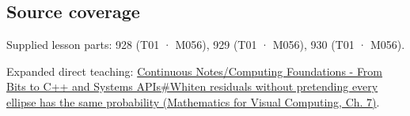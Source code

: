 \subsection{Source coverage}\label{appendix-12bbe185dbe5-source-coverage}

\hypertarget{appendix-12bbe185dbe5-source-coverage}{}

Supplied lesson parts: 928 (T01 · M056), 929 (T01 · M056), 930 (T01 · M056).

Expanded direct teaching: \href{../02-Mathematics-for-Visual-Computing/main.pdf\#nameddest=02-foundations-ii-ch023-whiten-residuals-without-pretending-every-ellipse-has-the-same-probability}{Continuous Notes/Computing Foundations - From Bits to C++ and Systems APIs\#Whiten residuals without pretending every ellipse has the same probability (Mathematics for Visual Computing, Ch. 7)}.
